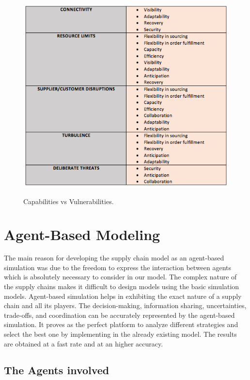 \begin{figure}[H]
  \centering
  \includegraphics[width=6.0in]{figures/pdf/CV.png}\\
  \caption{Capabilities vs Vulnerabilities.}\label{CV}
\end{figure}




\newpage
\section{Agent-Based Modeling}

The main reason for developing the supply chain model as an agent-based simulation was due to the freedom to express the interaction between agents which is absolutely necessary to consider in our model. The complex nature of the supply chains makes it difficult to design models using the basic simulation models. Agent-based simulation helps in exhibiting the exact nature of a supply chain and all its players. The decision-making, information sharing, uncertainties, trade-offs, and coordination can be accurately represented by the agent-based simulation. It proves as the perfect platform to analyze different strategies and select the best one by implementing in the already existing model. The results are obtained at a fast rate and at an higher accuracy. 

\subsection{The Agents involved}

